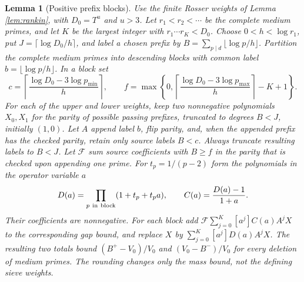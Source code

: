 \documentclass[11pt]{article}
\newtheorem{lemma}[theorem]{Lemma}
\begin{document}
\begin{lemma}[Positive prefix blocks]\label{lem:prefixblocks}
Use the finite Rosser weights of Lemma \ref{lem:rankin}, with
$D_0=T^u$ and $u>3$. Let $r_1<r_2<\cdots$ be the complete medium
primes, and let $K$ be the largest integer with
$r_1\cdots r_K<D_0$. Choose $0<h<\log r_1$, put
$J=\lceil\log D_0/h\rceil$, and label a chosen prefix by
$B=\sum_{p\mid d}\lfloor\log p/h\rfloor$.
Partition the complete medium primes into descending blocks with
common label $b=\lfloor\log p/h\rfloor$. In a block set
\[
c=\left\lceil\frac{\log D_0-3\log p_{\min}}h\right\rceil,\qquad
f=\max\left\{0,
\left\lceil\frac{\log D_0-3\log p_{\max}}h\right\rceil-K+1\right\}.
\]
For each of the upper and lower weights, keep two nonnegative
polynomials $X_0,X_1$ for the parity of possible passing prefixes,
truncated to degrees $B<J$, initially $(1,0)$.
Let $A$ append label $b$, flip parity, and, when the appended prefix
has the checked parity, retain only source labels $B<c$.
Always truncate resulting labels to $B<J$.
Let $\mathcal F$ sum source coefficients with $B\ge f$ in the
parity that is checked upon appending one prime.
For $t_p=1/(p-2)$ form the polynomials in the operator variable $a$
\[
D(a)=\prod_{p\ {\rm in\ block}}(1+t_p+t_pa),\qquad
C(a)=\frac{D(a)-1}{1+a}.
\]
Their coefficients are nonnegative. For each block add
$\mathcal F\sum_{j=0}^K[a^j]C(a)A^jX$ to the corresponding gap
bound, and replace $X$ by
$\sum_{j=0}^K[a^j]D(a)A^jX$.
The resulting two totals bound $(B^+-V_0)/V_0$ and
$(V_0-B^-)/V_0$ for every deletion of medium primes.
The rounding changes only the mass bound, not the defining sieve weights.
\end{lemma}
\end{document}
